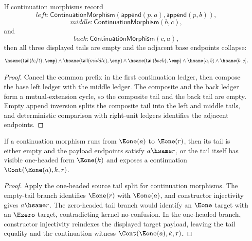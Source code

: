 \begin{theorem}
\label{thm:continuation-morphism-prefix-triangle-cycle-tails-empty}
If continuation morphisms record
$$
left:\mathsf{ContinuationMorphism}(\mathsf{append}(p,a),\mathsf{append}(p,b)),
$$
$$
middle:\mathsf{ContinuationMorphism}(b,c),
$$
and
$$
back:\mathsf{ContinuationMorphism}(c,a),
$$
then all three displayed tails are empty and the adjacent base endpoints
collapse:
$$
\hsame(\mathsf{tail}(left),\emp)\land
\hsame(\mathsf{tail}(middle),\emp)\land
\hsame(\mathsf{tail}(back),\emp)\land
\hsame(a,b)\land\hsame(b,c).
$$
\end{theorem}
\begin{proof}
Cancel the common prefix in the first continuation ledger, then compose the
base left ledger with the middle ledger. The composite and the back ledger form
a mutual-extension cycle, so the composite tail and the back tail are empty.
Empty append inversion splits the composite tail into the left and middle
tails, and deterministic comparison with right-unit ledgers identifies the
adjacent endpoints.
\end{proof}

\begin{theorem}
\label{thm:category-continuation-morphism-e1-source-e1-target-tail-cases}
If a continuation morphism runs from $\Eone(a)$ to $\Eone(r)$, then its tail is
either empty and the payload endpoints satisfy $a\hsame r$, or the tail itself
has visible one-headed form $\Eone(k)$ and exposes a continuation
$\Cont(\Eone(a),k,r)$.
\end{theorem}
\begin{proof}
Apply the one-headed source tail split for continuation morphisms. The
empty-tail branch identifies $\Eone(r)$ with $\Eone(a)$, and constructor
injectivity gives $a\hsame r$. The zero-headed tail branch would identify an
$\Eone$ target with an $\Ezero$ target, contradicting kernel no-confusion. In
the one-headed branch, constructor injectivity reindexes the displayed target
payload, leaving the tail equality and the continuation witness
$\Cont(\Eone(a),k,r)$.
\end{proof}

